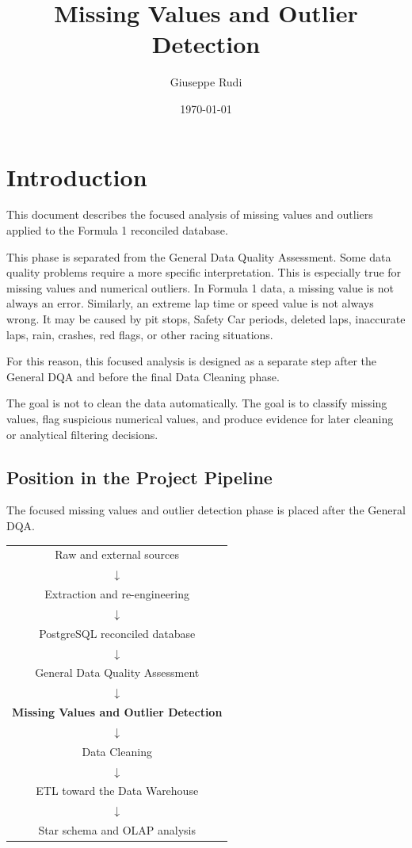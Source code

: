\documentclass[a4paper,11pt]{article}
\title{Missing Values and Outlier Detection}
\author{Giuseppe Rudi}
\date{\today}
\begin{document}
	
	\maketitle
	
	
	\section{Introduction}

	
	This document describes the focused analysis of missing values and outliers applied to the Formula 1 reconciled database.
	
	This phase is separated from the General Data Quality Assessment. Some data quality problems require a more specific interpretation.
	This is especially true for missing values and numerical outliers.
	In Formula 1 data, a missing value is not always an error.
	Similarly, an extreme lap time or speed value is not always wrong.
	It may be caused by pit stops, Safety Car periods, deleted laps, inaccurate laps, rain, crashes, red flags, or other racing situations.
	
	
	For this reason, this focused analysis is designed as a separate step after the General DQA and before the final Data Cleaning phase.
	
	The goal is not to clean the data automatically.
	The goal is to classify missing values, flag suspicious numerical values, and produce evidence for later cleaning or analytical filtering decisions.
	
	\subsection{Position in the Project Pipeline}
	
	The focused missing values and outlier detection phase is placed after the General DQA.
	
	\begin{center}
		\begin{tabular}{c}
			Raw and external sources \\
			$\downarrow$ \\
			Extraction and re-engineering \\
			$\downarrow$ \\
			PostgreSQL reconciled database \\
			$\downarrow$ \\
			General Data Quality Assessment \\
			$\downarrow$ \\
			\textbf{Missing Values and Outlier Detection} \\
			$\downarrow$ \\
			Data Cleaning \\
			$\downarrow$ \\
			ETL toward the Data Warehouse \\
			$\downarrow$ \\
			Star schema and OLAP analysis
		\end{tabular}
	\end{center}
	
\end{document}
